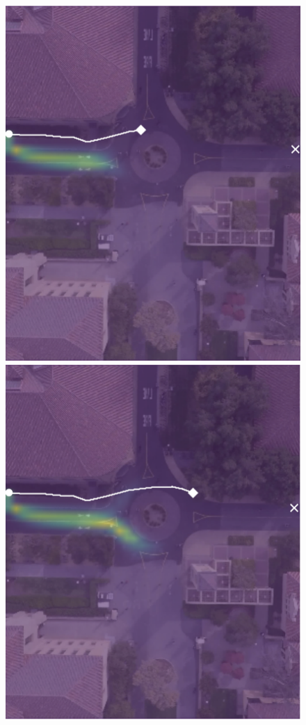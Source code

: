 \documentclass[letterpaper,10pt,conference]{ieeeconf}
\begin{document}
\begin{figure}
\begin{minipage}[t]{0.3\linewidth}
	\includegraphics[width=\linewidth]{./figures/comparison/kit_death_1_2_t=250.png}
\end{minipage}
\begin{minipage}[t]{0.3\linewidth}
	\includegraphics[width=\linewidth]{./figures/comparison/kit_death_1_2_t=370.png}
\end{minipage}


\end{figure}
\end{document}
